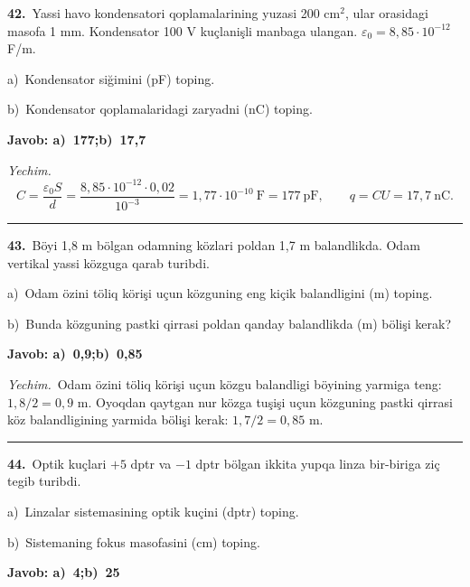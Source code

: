 \documentclass[11pt,a4paper]{article}
\begin{document}
\noindent\textbf{42.}\ Yassi havo kondensatori qoplamalarining yuzasi 200 cm$^2$, ular orasidagi masofa 1 mm. Kondensator 100 V kuçlanişli manbaga ulangan. $\varepsilon_0=8{,}85\cdot10^{-12}$ F/m.\par
\noindent\hspace*{4mm}a)\ Kondensator siğimini (pF) toping.\par
\noindent\hspace*{4mm}b)\ Kondensator qoplamalaridagi zaryadni (nC) toping.\par
\noindent\colorbox{gray!12}{\parbox{\dimexpr\linewidth-2\fboxsep}{\textbf{Javob: a)\ 177;\quad b)\ 17,7}}}\par\smallskip
\noindent\textit{Yechim.}\ \[C=\frac{\varepsilon_0S}{d}=\frac{8{,}85\cdot10^{-12}\cdot0{,}02}{10^{-3}}=1{,}77\cdot10^{-10}\ \text{F}=177\ \text{pF},\qquad q=CU=17{,}7\ \text{nC}.\]\par\medskip\hrule\medskip
{}\noindent\textbf{43.}\ Böyi 1,8 m bölgan odamning közlari poldan 1,7 m balandlikda. Odam vertikal yassi közguga qarab turibdi.\par
\noindent\hspace*{4mm}a)\ Odam özini töliq körişi uçun közguning eng kiçik balandligini (m) toping.\par
\noindent\hspace*{4mm}b)\ Bunda közguning pastki qirrasi poldan qanday balandlikda (m) bölişi kerak?\par
\noindent\colorbox{gray!12}{\parbox{\dimexpr\linewidth-2\fboxsep}{\textbf{Javob: a)\ 0,9;\quad b)\ 0,85}}}\par\smallskip
\noindent\textit{Yechim.}\ Odam özini töliq körişi uçun közgu balandligi böyining yarmiga teng: $1{,}8/2=0{,}9$ m. Oyoqdan qaytgan nur közga tuşişi uçun közguning pastki qirrasi köz balandligining yarmida bölişi kerak: $1{,}7/2=0{,}85$ m.\par\par\medskip\hrule\medskip
{}\noindent\textbf{44.}\ Optik kuçlari $+5$ dptr va $-1$ dptr bölgan ikkita yupqa linza bir-biriga ziç tegib turibdi.\par
\noindent\hspace*{4mm}a)\ Linzalar sistemasining optik kuçini (dptr) toping.\par
\noindent\hspace*{4mm}b)\ Sistemaning fokus masofasini (cm) toping.\par
\noindent\colorbox{gray!12}{\parbox{\dimexpr\linewidth-2\fboxsep}{\textbf{Javob: a)\ 4;\quad b)\ 25}}}\par\smallskip
\end{document}

